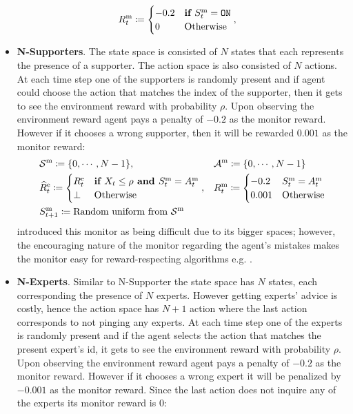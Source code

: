 \begin{itemize}[leftmargin=*]
\begin{align*}
        & R^\text{m}_t \coloneq 
        \begin{cases}
        -0.2 & \textbf{if } S^\text{m}_t = \texttt{ON}\\
        0 & \text{Otherwise}
        \end{cases},
    \end{align*}
    \item \textbf{N-Supporters}. The state space is consisted of $N$ states that each represents the presence of a supporter. The action space is also consisted of $N$ actions. At each time step one of the supporters is randomly present and if agent could choose the action that matches the index of the supporter, then it gets to see the environment reward with probability $\rho$. Upon observing the environment reward agent pays a penalty of $-0.2$ as the monitor reward. However if it chooses a wrong supporter, then it will be rewarded $0.001$ as the monitor reward:
    \begin{align*}
        &\mathcal{S}^\text{m} \coloneq \{0, \cdots, N - 1\}, 
        && \mathcal{A}^\text{m} \coloneq \{0, \cdots, N - 1\} \\
        & \widehat{R}^\text{e}_t \coloneq 
        \begin{cases}
        R^\text{e}_t & \textbf{if } X_t \leq \rho \textbf{ and } S^\text{m}_t = A^\text{m}_t\\
        \bot & \text{Otherwise}
        \end{cases},
        && R^\text{m}_t \coloneq 
        \begin{cases}
        -0.2 &  S^\text{m}_t = A^\text{m}_t\\
        0.001 & \text{Otherwise}
        \end{cases} \\
        & S^\text{m}_{t + 1} \coloneq \text{Random uniform from } \mathcal{S}^\text{m}
    \end{align*}
    \citet{parisi2024beyond} introduced this monitor as being difficult due to its bigger spaces; however, the encouraging nature of the monitor regarding the agent's mistakes makes the monitor easy for reward-respecting algorithms e.g. \thealgo.
    \item \textbf{N-Experts}. Similar to N-Supporter the state space has $N$ states, each corresponding the presence of $N$ experts. However getting experts' advice is costly, hence the action space has $N + 1$ action where the last action corresponds to not pinging any experts. At each time step one of the experts is randomly present and if the agent selects the action that matches the present expert's id, it gets to see the environment reward with probability $\rho$. Upon observing the environment reward agent pays a penalty of $-0.2$ as the monitor reward. However if it chooses a wrong expert it will be penalized by $-0.001$ as the monitor reward. Since the last action does not inquire any of the experts its monitor reward is $0$:

\end{itemize}
